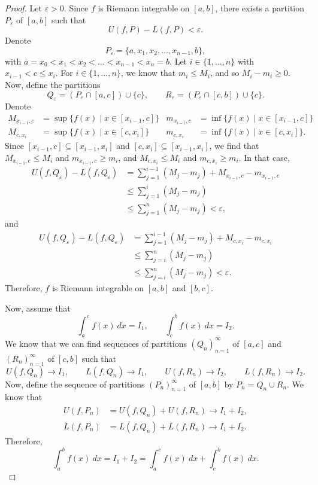 \documentclass[a4paper, openany]{memoir}
\theoremstyle{definition}
\theoremstyle{plain}
\begin{document}
\begin{proof}
Let $\varepsilon > 0$. Since $f$ is Riemann integrable on $[a, b]$, there exists a partition $P_\varepsilon$ of $[a, b]$ such that
\[U(f, P) - L(f, P) < \varepsilon.\]
Denote 
\[P_\varepsilon = \{a, x_1, x_2, \dots, x_{n-1}, b\},\]
with $a = x_0 < x_1 < x_2 < \dots < x_{n-1} < x_n = b$. Let $i \in \{1, \dots, n\}$ with $x_{i-1} < c \leqslant x_i$. For $i \in \{1, \dots, n\}$, we know that $m_i \leqslant M_i$, and so $M_i - m_i \geqslant 0$. Now, define the partitions
\[Q_\varepsilon = (P_\varepsilon \cap [a, c]) \cup \{c\}, \qquad R_\varepsilon = (P_\varepsilon \cap [c, b]) \cup \{c\}.\]
Denote
\begin{align*}
    M_{x_{i-1}, c} &= \sup \{f(x) \mid x \in [x_{i-1}, c]\} & m_{x_{i-1}, c} &= \inf \{f(x) \mid x \in [x_{i-1}, c]\} \\
    M_{c, x_i} &= \sup \{f(x) \mid x \in [c, x_i]\} & m_{c, x_i} &= \inf \{f(x) \mid x \in [c, x_i]\}.
\end{align*}
Since $[x_{i-1}, c] \subseteq [x_{i-1}, x_i]$ and $[c, x_i] \subseteq [x_{i-1}, x_i]$, we find that $M_{x_{i-1}, c} \leqslant M_i$ and $m_{x_{i-1}, c} \geqslant m_i$, and $M_{c, x_i} \leqslant M_i$ and $m_{c, x_i} \geqslant m_i$. In that case,
\begin{align*}
    U(f, Q_\varepsilon) - L(f, Q_\varepsilon) &= \sum_{j=1}^{i-1} (M_j - m_j) + M_{x_{i-1}, c} - m_{x_{i-1}, c} \\
    &\leqslant \sum_{j=1}^i (M_j - m_j) \\
    &\leqslant \sum_{j=1}^n (M_j - m_j) < \varepsilon,
\end{align*}
and
\begin{align*}
    U(f, Q_\varepsilon) - L(f, Q_\varepsilon) &= \sum_{j=1}^{i-1} (M_j - m_j) + M_{c, x_i} - m_{c, x_i} \\
    &\leqslant \sum_{j=i}^n (M_j - m_j) \\
    &\leqslant \sum_{j=i}^n (M_j - m_j) < \varepsilon.
\end{align*}
Therefore, $f$ is Riemann integrable on $[a, b]$ and $[b, c]$.

\noindent Now, assume that
\[\int_a^c f(x) \ dx = I_1, \qquad \int_c^b f(x) \ dx = I_2.\]
We know that we can find sequences of partitions $(Q_n)_{n=1}^{\infty}$ of $[a, c]$ and $(R_n)_{n=1}^{\infty}$ of $[c, b]$ such that
\[U(f, Q_n) \to I_1, \qquad L(f, Q_n) \to I_1, \qquad U(f, R_n) \to I_2, \qquad L(f, R_n) \to I_2.\]
Now, define the sequence of partitions $(P_n)_{n=1}^{\infty}$ of $[a, b]$ by $P_n = Q_n \cup R_n$. We know that
\begin{align*}
    U(f, P_n) &= U(f, Q_n) + U(f, R_n) \to I_1 + I_2, \\
    L(f, P_n) &= L(f, Q_n) + L(f, R_n) \to I_1 + I_2.
\end{align*}
Therefore,
\[\int_a^b f(x) \ dx = I_1 + I_2 = \int_a^c f(x) \ dx + \int_c^b f(x) \ dx.\]
\end{proof}
\end{document}
